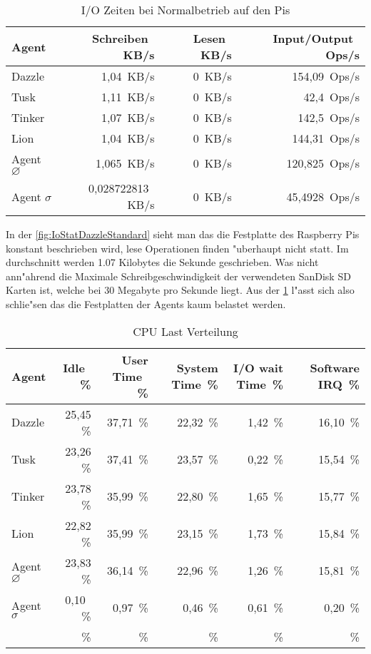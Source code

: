 \begin{table}
\centering
\begin{tabular}{l%
 r<{\,KB/s}%
 r<{\,KB/s}%
 r<{\,Ops/s}%
}
Agent	  			& Schreiben	 	& Lesen			& Input/Output 		\\	
\hline
Dazzle 				& 1,04			& 0			& 154,09	        \\
Tusk 				& 1,11			& 0			& 42,4			\\
Tinker				& 1,07 			& 0			& 142,5		 	\\
Lion				& 1,04			& 0			& 144,31	 	\\
Agent $\diameter $  		& 1,065			& 0			& 120,825		\\   
Agent $\sigma $ 		& 0,028722813  		& 0			& 45,4928		\\
\end{tabular}
\caption{I/O Zeiten bei Normalbetrieb auf den Pis}
\label{tab:NormalbetriebIoStat20Mb}
\end{table}


In der \cref{fig:IoStatDazzleStandard} sieht man das die Festplatte des Raspberry Pis konstant beschrieben wird, lese Operationen finden "uberhaupt nicht statt. %
Im durchschnitt werden 1.07 Kilobytes die Sekunde geschrieben.  %
Was nicht ann"ahrend die Maximale Schreibgeschwindigkeit der verwendeten %
SanDisk SD Karten ist, welche bei 30 Megabyte pro Sekunde \autocite{san:sd} liegt. %
Aus der \cref{tab:NormalbetriebIoStat20Mb} l"asst sich also schlie"sen das die Festplatten der Agents kaum belastet werden. %

\begin{table}
\centering
\begin{tabular}{l%
 r<{\,\%}%
 r<{\,\%}%
 r<{\,\%}%
 r<{\,\%}%
 r<{\,\%}%
}
Agent  				& Idle			& User Time		& System Time		& I/O wait Time	& Software IRQ	\\
\hline
Dazzle 				& 25,45			& 37,71			& 22,32 		& 1,42		& 16,10	\\
Tusk 				& 23,26			& 37,41			& 23,57			& 0,22		& 15,54	\\
Tinker				& 23,78			& 35,99			& 22,80			& 1,65		& 15,77	\\
Lion				& 22,82			& 35,99			& 23,15			& 1,73		& 15,84	\\ 
Agent $\diameter $  		& 23,83			& 36,14			& 22,96			& 1,26	 	& 15,81	\\   
Agent $\sigma $			&  0,10			&  0,97			&  0,46			& 0,61		& 0,20  \\ %
%
&\end{tabular}
\caption{CPU Last Verteilung}
\label{tab:CPUlastverteilung20Mb}
\end{table}

